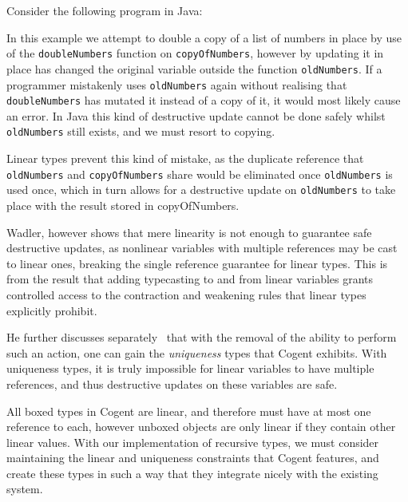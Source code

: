 Consider the following program in Java:



In this example we attempt to double a copy of a list of numbers in place by use of the \verb|doubleNumbers|
function on \verb|copyOfNumbers|, however by updating it in place has changed the original variable outside
the function \verb|oldNumbers|. If a programmer mistakenly uses \verb|oldNumbers| again without realising that
\verb|doubleNumbers| has mutated it instead of a copy of it, it would most likely cause an error. In 
Java this kind of destructive update cannot be done safely whilst \verb|oldNumbers| still exists, and we
must resort to copying.

Linear types prevent this kind of mistake, as the duplicate reference that
\verb|oldNumbers| and \verb|copyOfNumbers| share would be eliminated once \verb|oldNumbers| is used once,
which in turn allows for a destructive update on \verb|oldNumbers| to take place with the result stored in
copyOfNumbers.

Wadler, however shows that mere linearity is not enough to guarantee safe destructive updates, as nonlinear
variables with multiple references may be cast to linear ones, breaking the single reference guarantee
for linear types. This is from the result that adding typecasting to and from linear variables grants 
controlled access to the contraction and weakening rules that linear types explicitly prohibit.

He further discusses separately~\citep{WadlerLinearLogic} that with the removal of
the ability to perform such an action, one can gain the \textit{uniqueness} types that Cogent 
exhibits. With uniqueness types, it is truly impossible for linear variables to have multiple references,
and thus destructive updates on these variables are safe. 

All boxed types in Cogent are linear, and therefore must have at most one reference to each,
however unboxed objects are only linear if they contain other linear values.
With our implementation of recursive types, we must consider maintaining the linear and uniqueness constraints
that Cogent features, and create these types in such a way that they integrate nicely with the existing
system.